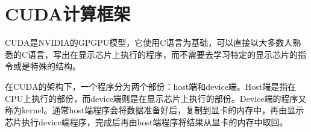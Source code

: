 % 

\chapter{CUDA计算框架}
  CUDA是NVIDIA的GPGPU模型，它使用C语言为基础，可以直接以大多数人熟悉的C语言，写出在显示芯片上执行的程序，而不需要去学习特定的显示芯片的指令或是特殊的结构\cite{nvidia2011nvidia}。
  \par
  在CUDA的架构下，一个程序分为两个部份：host端和device端。Host端是指在CPU上执行的部份，而device端则是在显示芯片上执行的部份。Device端的程序又称为kernel。通常host端程序会将数据准备好后，复制到显卡的内存中，再由显示芯片执行device端程序，完成后再由host端程序将结果从显卡的内存中取回。
